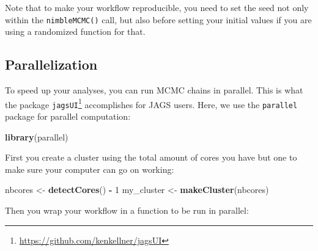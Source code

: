 \documentclass[
  12pt,
]{krantz}
\newenvironment{Shaded}{\begin{snugshade}}{\end{snugshade}}
\newcommand{\DecValTok}[1]{\textcolor[rgb]{0.00,0.00,0.81}{#1}}
\newcommand{\FunctionTok}[1]{\textcolor[rgb]{0.13,0.29,0.53}{\textbf{#1}}}
\newcommand{\NormalTok}[1]{#1}
\newcommand{\OtherTok}[1]{\textcolor[rgb]{0.56,0.35,0.01}{#1}}
\newcommand{\SpecialCharTok}[1]{\textcolor[rgb]{0.81,0.36,0.00}{\textbf{#1}}}
\begin{document}
Note that to make your workflow reproducible, you need to set the seed not only within the \texttt{nimbleMCMC()} call, but also before setting your initial values if you are using a randomized function for that.

\subsection{Parallelization}\label{parallelization}

To speed up your analyses, you can run MCMC chains in parallel. This is what the package \texttt{jagsUI}\footnote{\url{https://github.com/kenkellner/jagsUI}} accomplishes for JAGS users. Here, we use the \texttt{parallel} package for parallel computation:

\begin{Shaded}
\begin{Highlighting}[]
\FunctionTok{library}\NormalTok{(parallel)}
\end{Highlighting}
\end{Shaded}

First you create a cluster using the total amount of cores you have but one to make sure your computer can go on working:

\begin{Shaded}
\begin{Highlighting}[]
\NormalTok{nbcores }\OtherTok{\textless{}{-}} \FunctionTok{detectCores}\NormalTok{() }\SpecialCharTok{{-}} \DecValTok{1}
\NormalTok{my\_cluster }\OtherTok{\textless{}{-}} \FunctionTok{makeCluster}\NormalTok{(nbcores)}
\end{Highlighting}
\end{Shaded}

Then you wrap your workflow in a function to be run in parallel:
\end{document}
